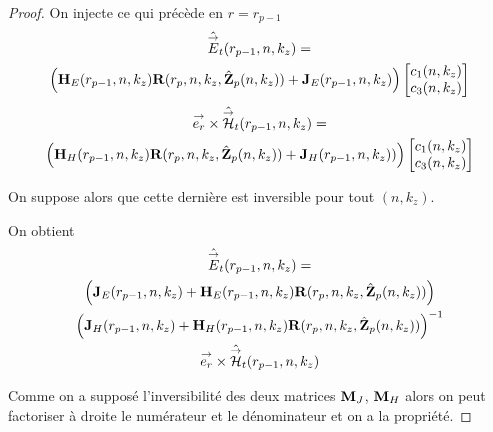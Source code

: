 \begin{proof}
      On injecte ce qui précède en \(r = r_{p-1}\)
      \begin{multline*}
        \hat{{\overset{\rightarrow}{E}}}_t(r_{p-1},n,k_z) = 
        \\
        \left(\mathbf{H}_{E}(r_{p-1},n,k_z)\mathbf{R}(r_{p},n,k_z,\hat{\mathbf{Z}}_p(n,k_z)) + \mathbf{J}_{E}(r_{p-1},n,k_z)\right)
        \begin{bmatrix}
          c_1(n,k_z) \\
          c_3(n,k_z)
        \end{bmatrix}
      \end{multline*}        
      \begin{multline*}
        {\overset{\rightarrow}{e_r}}\times\hat{{\overset{\rightarrow}{\mathcal{H}}}}_t(r_{p-1},n,k_z) =
        \\
        \left(\mathbf{H}_{H}(r_{p-1},n,k_z)\mathbf{R}(r_{p},n,k_z,\hat{\mathbf{Z}}_p(n,k_z)) + \mathbf{J}_{H}(r_{p-1},n,k_z))\right)
        \begin{bmatrix}
          c_1(n,k_z) \\
          c_3(n,k_z)
        \end{bmatrix}
      \end{multline*}

      On suppose alors que cette dernière est inversible pour tout \((n,k_z)\).

      On obtient
      \begin{multline*}
        \hat{{\overset{\rightarrow}{E}}}_t(r_{p-1},n,k_z) =
        \\
        \left(\mathbf{J}_{E}(r_{p-1},n,k_z) + \mathbf{H}_{E}(r_{p-1},n,k_z)\mathbf{R}(r_{p},n,k_z,\hat{\mathbf{Z}}_p(n,k_z))\right) \\
        \left(\mathbf{J}_{H}(r_{p-1},n,k_z) + \mathbf{H}_{H}(r_{p-1},n,k_z)\mathbf{R}(r_{p},n,k_z,\hat{\mathbf{Z}}_p(n,k_z))\right)^{-1}
        \\
        {\overset{\rightarrow}{e_r}}\times\hat{{\overset{\rightarrow}{\mathcal{H}}}}_t(r_{p-1},n,k_z)
      \end{multline*}

      Comme on a supposé l'inversibilité des deux matrices \(\mathbf{M}_J\), \(\mathbf{M}_H\) alors on peut factoriser à droite le numérateur et le dénominateur et on a la propriété.
    \end{proof}

